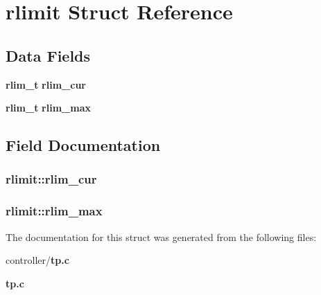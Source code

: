 \section{rlimit Struct Reference}
\label{structrlimit}
\subsection*{Data Fields}
\begin{DoxyCompactItemize}
\item 
{\bf rlim\_\-t} {\bf rlim\_\-cur}
\item 
{\bf rlim\_\-t} {\bf rlim\_\-max}
\end{DoxyCompactItemize}


\subsection{Field Documentation}
\subsubsection[{rlim\_\-cur}]{ {\bf rlimit::rlim\_\-cur}}\label{structrlimit_afb303c82ed3027a353e423a555b944b4}
\subsubsection[{rlim\_\-max}]{ {\bf rlimit::rlim\_\-max}}\label{structrlimit_ab24ab4934cab539abf45b259f5db7639}


The documentation for this struct was generated from the following files:\begin{DoxyCompactItemize}
\item 
controller/{\bf tp.c}\item 
{\bf tp.c}\end{DoxyCompactItemize}
